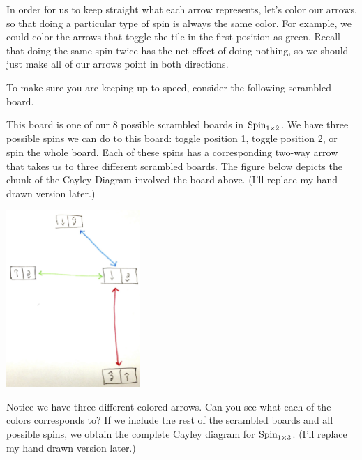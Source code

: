 In order for us to keep straight what each arrow represents, let's color our arrows, so that doing a particular type of spin is always the same color.  For example, we could color the arrows that toggle the tile in the first position as green.  Recall that doing the same spin twice has the net effect of doing nothing, so we should just make all of our arrows point in both directions.

To make sure you are keeping up to speed, consider the following scrambled board.

\begin{center}
\end{center}

This board is one of our 8 possible scrambled boards in \(\operatorname{Spin}_{1\times 2}\).  We have three possible spins we can do to this board: toggle position 1, toggle position 2, or spin the whole board.  Each of these spins has a corresponding two-way arrow that takes us to three different scrambled boards.  The figure below depicts the chunk of the Cayley Diagram involved the board above.  (I'll replace my hand drawn version later.)

\begin{center}
\includegraphics[width=2in]{chunk-cayley-spin1by2.png}
\end{center}

\noindent Notice we have three different colored arrows.  Can you see what each of the colors corresponds to?  If we include the rest of the scrambled boards and all possible spins, we obtain the complete Cayley diagram for \(\operatorname{Spin}_{1\times 3}\).  (I'll replace my hand drawn version later.)

